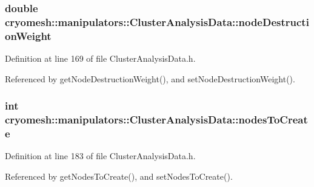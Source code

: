 \hypertarget{classcryomesh_1_1manipulators_1_1ClusterAnalysisData_ace52167d730c5513c9981a7be9a56499}{
\subsubsection[{node\-Destruction\-Weight}]{\setlength{\rightskip}{0pt plus 5cm}double {\bf cryomesh\-::manipulators\-::\-Cluster\-Analysis\-Data\-::node\-Destruction\-Weight}}}\label{classcryomesh_1_1manipulators_1_1ClusterAnalysisData_ace52167d730c5513c9981a7be9a56499}


\-Definition at line 169 of file \-Cluster\-Analysis\-Data.\-h.



\-Referenced by get\-Node\-Destruction\-Weight(), and set\-Node\-Destruction\-Weight().

\hypertarget{classcryomesh_1_1manipulators_1_1ClusterAnalysisData_aa7100219ad6f168229ae1bea3b0f4c95}{
\subsubsection[{nodes\-To\-Create}]{\setlength{\rightskip}{0pt plus 5cm}int {\bf cryomesh\-::manipulators\-::\-Cluster\-Analysis\-Data\-::nodes\-To\-Create}}}\label{classcryomesh_1_1manipulators_1_1ClusterAnalysisData_aa7100219ad6f168229ae1bea3b0f4c95}


\-Definition at line 183 of file \-Cluster\-Analysis\-Data.\-h.



\-Referenced by get\-Nodes\-To\-Create(), and set\-Nodes\-To\-Create().


